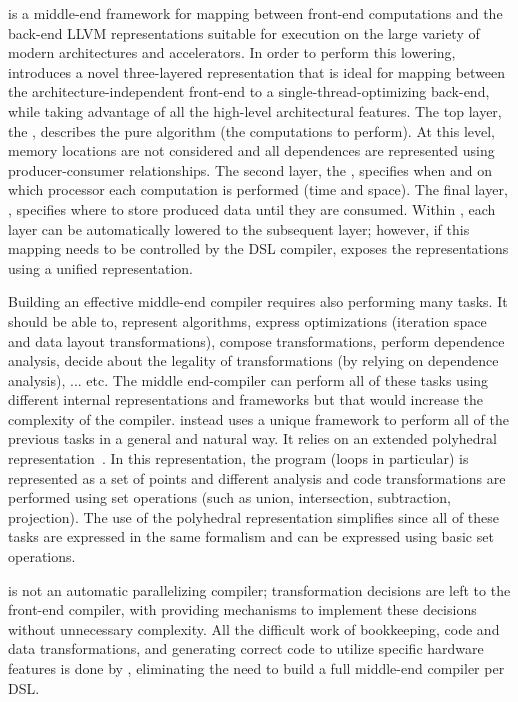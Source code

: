 \framework{} is a middle-end framework for mapping between front-end computations and the back-end LLVM representations suitable for execution on the large variety of modern architectures and accelerators.  In order to perform this lowering, \framework{} introduces a novel three-layered representation that is ideal for mapping between the architecture-independent front-end to a single-thread-optimizing back-end, while taking advantage of all the high-level architectural features. The top layer, the {\it \Layerone}, describes the pure algorithm (the computations to perform). At this level, memory locations are not considered and all dependences are represented using producer-consumer relationships.  The second layer, the {\it \Layertwo}, specifies when and on which processor each computation is performed (time and space). The final layer, {\it \Layerthree}, specifies where to store produced data until they are consumed.  Within \framework{}, each layer can be automatically lowered to the subsequent layer; however, if this mapping needs to be controlled by the DSL compiler, \framework{} exposes the representations using a unified representation.

Building an effective middle-end compiler requires also performing many tasks.  It should be able to, represent algorithms, express optimizations (iteration space and data layout transformations),  compose transformations, perform dependence analysis, decide about the legality of transformations (by relying on dependence analysis), ... etc.  The middle end-compiler can perform all of these tasks using different internal representations and frameworks but that would increase the complexity of the compiler.  \framework{} instead uses a unique framework to perform all of the previous tasks in a general and natural way.  It relies on an extended polyhedral representation~\cite{polyhedral_model}.  In this representation, the program (loops in particular) is represented as a set of points and different analysis and code transformations are performed using set operations (such as union, intersection, subtraction, projection).  The use of the polyhedral representation simplifies \framework{} since all of these tasks are expressed in the same formalism and can be expressed using basic set operations.

\framework{} is not an automatic parallelizing compiler; transformation decisions are left to the front-end compiler, with \framework{} providing mechanisms to implement these decisions without unnecessary complexity.
All the difficult work of bookkeeping, code and data transformations, and generating correct code to utilize specific hardware features is done by \framework{}, eliminating the need to build a full middle-end compiler per DSL.


